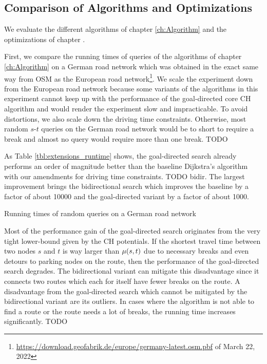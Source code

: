 \subsection{Comparison of Algorithms and Optimizations}
We evaluate the different algorithms of chapter \ref{ch:Algorithm} and the optimizations of chapter .

First, we compare the running times of queries of the algorithms of chapter \ref{ch:Algorithm} on a German road network which was obtained in the exact same way from OSM as the European road network\footnote{\url{https://download.geofabrik.de/europe/germany-latest.osm.pbf} of March 22, 2022}. We scale the experiment down from the European road network because some variants of the algorithms in this experiment cannot keep up with the performance of the goal-directed core CH algorithm and would render the experiment slow and impracticable. To avoid distortions, we also scale down the driving time constraints. Otherwise, most random $s$-$t$ queries on the German road network would be to short to require a break and almost no query would require more than one break. TODO

As Table \ref{tbl:extensions_runtime} shows, the goal-directed search already performs an order of magnitude better than the baseline Dijkstra's algorithm with our amendments for driving time constraints. TODO bidir. The largest improvement brings the bidirectional search which improves the baseline by a factor of about \num{10000} and the goal-directed variant by a factor of about \num{1000}.

\begin{table}[hbtp]
	\centering
	
	\caption{Running times of random queries on a German road network}
	\label{tbl:extensions_runtime}
\end{table}

Most of the performance gain of the goal-directed search originates from the very tight lower-bound given by the CH potentials. If the shortest travel time between two nodes $s$ and $t$ is way larger than $\mu(s,t)$ due to necessary breaks and even detours to parking nodes on the route, then the performance of the goal-directed search degrades. The bidirectional variant can mitigate this disadvantage since it connects two routes which each for itself have fewer breaks on the route. A disadvantage from the goal-directed search which cannot be mitigated by the bidirectional variant are its outliers. In cases where the algorithm is not able to find a route or the route needs a lot of breaks, the running time increases significantly. TODO

